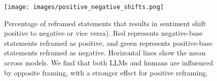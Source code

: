 \begin{figure}
    \centering
    \texttt{[image: images/positive\_negative\_shifts.png]}
    \caption{Percentage of reframed statements that results in sentiment shift positive to negative or vice versa). Red represents negative-base statements reframed as positive, and green represents positive-base statements reframed as negative. Horizontal lines show the mean across models. We find that both LLMs and humans are influenced by opposite framing, with a stronger effect for positive reframing.}
    \label{fig:models-sentiment-shifts}
\end{figure}